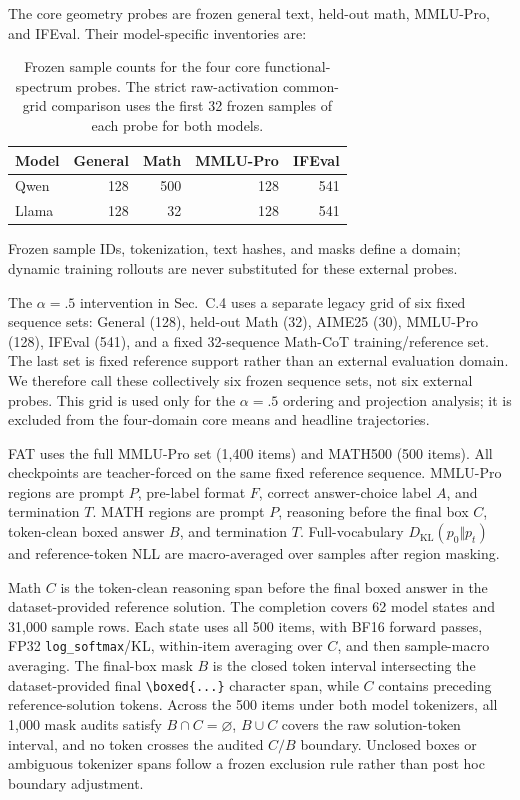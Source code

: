 \documentclass[letterpaper]{article} %
\begin{document}
The core geometry probes are frozen general text, held-out math, MMLU-Pro, and IFEval.
Their model-specific inventories are:
\begin{table}[t]
\centering
\small
\setlength{\tabcolsep}{4pt}
\begin{tabular}{lrrrr}
\toprule
Model & General & Math & MMLU-Pro & IFEval \\
\midrule
Qwen & 128 & 500 & 128 & 541 \\
Llama & 128 & 32 & 128 & 541 \\
\bottomrule
\end{tabular}
\caption{Frozen sample counts for the four core functional-spectrum probes. The strict
raw-activation common-grid comparison uses the first 32 frozen samples of each probe
for both models.}
\label{tab:supp-samples}
\end{table}
Frozen sample IDs, tokenization, text hashes, and masks define a domain; dynamic
training rollouts are never substituted for these external probes.

The $\alpha=.5$ intervention in Sec.~C.4 uses a separate legacy grid of six fixed
sequence sets: General (128), held-out Math (32), AIME25 (30), MMLU-Pro (128),
IFEval (541), and a fixed 32-sequence Math-CoT training/reference set. The last set is
fixed reference support rather than an external evaluation domain. We therefore call
these collectively six frozen sequence sets, not six external probes. This grid is used
only for the $\alpha=.5$ ordering and projection analysis; it is excluded from the
four-domain core means and headline trajectories.

FAT uses the full MMLU-Pro set (1,400 items) and MATH500 (500 items). All checkpoints are
teacher-forced on the same fixed reference sequence. MMLU-Pro regions are prompt $P$,
pre-label format $F$, correct answer-choice label $A$, and termination $T$. MATH regions
are prompt $P$, reasoning
before the final box $C$, token-clean boxed answer $B$, and termination $T$. Full-vocabulary
$D_{\mathrm{KL}}(p_0\Vert p_t)$ and reference-token NLL are macro-averaged over samples after
region masking.

Math $C$ is the token-clean reasoning span before the final boxed answer in the
dataset-provided reference solution. The completion covers 62 model states and 31,000
sample rows. Each state uses all 500 items, with BF16 forward passes, FP32
\texttt{log\_softmax}/KL, within-item averaging over $C$, and then sample-macro averaging.
The final-box mask $B$ is the closed token interval intersecting the dataset-provided
final \verb|\boxed{...}| character span, while $C$ contains preceding reference-solution
tokens. Across the 500 items under both model tokenizers, all 1,000 mask audits satisfy
$B\cap C=\varnothing$, $B\cup C$ covers the raw solution-token interval, and no token
crosses the audited $C/B$ boundary. Unclosed boxes or ambiguous tokenizer spans follow
a frozen exclusion rule rather than post hoc boundary adjustment.
\end{document}
